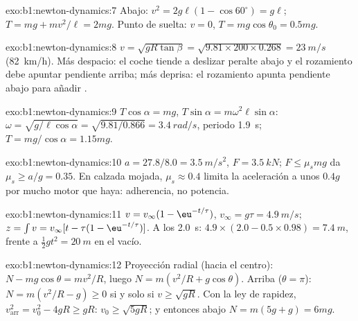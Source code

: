 \begin{solution}{exo:b1:newton-dynamics:7}
Abajo: $v^2 = 2g\ell(1 - \cos 60^\circ) = g\ell$; $T = mg + mv^2/\ell =
2mg$. Punto de suelta: $v = 0$, $T = mg\cos\theta_0 = 0.5mg$.
\end{solution}

\begin{solution}{exo:b1:newton-dynamics:8}
$v = \sqrt{gR\tan\beta} = \sqrt{9.81 \times 200 \times 0.268} = \qty{23}{m/s}$
(\qty{82}{km/h}). Más despacio: el coche tiende a deslizar peralte abajo y
el rozamiento debe apuntar pendiente arriba; más deprisa: el rozamiento
apunta pendiente abajo para añadir .
\end{solution}

\begin{solution}{exo:b1:newton-dynamics:9}
$T\cos\alpha = mg$, $T\sin\alpha = m\omega^2\ell\sin\alpha$: $\omega =
\sqrt{g/\ell\cos\alpha} = \sqrt{9.81/0.866} = \qty{3.4}{rad/s}$, periodo
\qty{1.9}{s}; $T = mg/\cos\alpha = 1.15mg$.
\end{solution}

\begin{solution}{exo:b1:newton-dynamics:10}
$a = 27.8/8.0 = \qty{3.5}{m/s^2}$, $F = \qty{3.5}{kN}$; $F \leq \mu_smg$
da $\mu_s \geq a/g = 0.35$. En calzada mojada, $\mu_s \approx 0.4$ limita
la aceleración a unos $0.4g$ por mucho motor que haya: adherencia, no potencia.
\end{solution}

\begin{solution}{exo:b1:newton-dynamics:11}
$v = v_\infty(1 - \eu^{-t/\tau})$, $v_\infty = g\tau = \qty{4.9}{m/s}$;
$z = \int v = v_\infty[t - \tau(1 - \eu^{-t/\tau})]$. A los \qty{2.0}{s}:
$4.9 \times (2.0 - 0.5 \times 0.98) = \qty{7.4}{m}$, frente a $\tfrac12 gt^2
= \qty{20}{m}$ en el vacío.
\end{solution}

\begin{solution}{exo:b1:newton-dynamics:12}
Proyección radial (hacia el centro): $N - mg\cos\theta = mv^2/R$, luego
$N = m(v^2/R + g\cos\theta)$. Arriba ($\theta = \pi$): $N = m(v^2/R - g)
\geq 0$ si y solo si $v \geq \sqrt{gR}$. Con la ley de rapidez, $v_{\text{arr}}^2 =
v_0^2 - 4gR \geq gR$: $v_0 \geq \sqrt{5gR}$; y entonces abajo $N =
m(5g + g) = 6mg$.
\end{solution}

